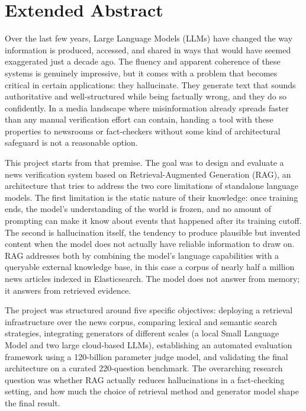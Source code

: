 

\chapter*{Extended Abstract}

Over the last few years, Large Language Models (LLMs) have changed the way information is produced, accessed, and shared in ways that would have seemed exaggerated just a decade ago. The fluency and apparent coherence of these systems is genuinely impressive, but it comes with a problem that becomes critical in certain applications: they hallucinate. They generate text that sounds authoritative and well-structured while being factually wrong, and they do so confidently. In a media landscape where misinformation already spreads faster than any manual verification effort can contain, handing a tool with these properties to newsrooms or fact-checkers without some kind of architectural safeguard is not a reasonable option.

This project starts from that premise. The goal was to design and evaluate a news verification system based on Retrieval-Augmented Generation (RAG), an architecture that tries to address the two core limitations of standalone language models. The first limitation is the static nature of their knowledge: once training ends, the model's understanding of the world is frozen, and no amount of prompting can make it know about events that happened after its training cutoff. The second is hallucination itself, the tendency to produce plausible but invented content when the model does not actually have reliable information to draw on. RAG addresses both by combining the model's language capabilities with a queryable external knowledge base, in this case a corpus of nearly half a million news articles indexed in Elasticsearch. The model does not answer from memory; it answers from retrieved evidence.

The project was structured around five specific objectives: deploying a retrieval infrastructure over the news corpus, comparing lexical and semantic search strategies, integrating generators of different scales (a local Small Language Model and two large cloud-based LLMs), establishing an automated evaluation framework using a 120-billion parameter judge model, and validating the final architecture on a curated 220-question benchmark. The overarching research question was whether RAG actually reduces hallucinations in a fact-checking setting, and how much the choice of retrieval method and generator model shape the final result.

